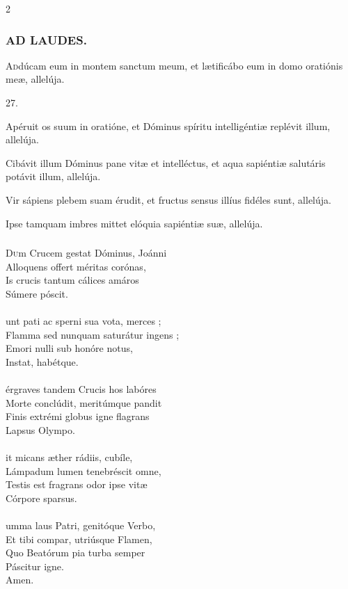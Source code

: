 \documentclass[9pt,twoside]{extarticle}
\begin{document}
\begin{multicols}{2}
{\subsubsection*{\center \textsc{AD LAUDES.}}
\begin{center}\end{center}
\lettrine{A}ddúcam eum in montem sanctum meum, et lætificábo eum in domo oratiónis meæ, allelúja.

\begin{tightlist}{}
\item {} 27.
\item {} Apéruit os suum in oratióne, et Dóminus spíritu intelligéntiæ replévit illum, allelúja.
\item {} Cibávit illum Dóminus pane vitæ et intelléctus, et aqua sapiéntiæ salutáris potávit illum, allelúja.
\item {} Vir sápiens plebem suam érudit, et fructus sensus illíus fidéles sunt, allelúja.
\item {} Ipse tamquam imbres mittet elóquia sapiéntiæ suæ, allelúja.
\end{tightlist}

\subsubsection*{\center {}}
\lettrine{D}um Crucem gestat Dóminus, Joánni\\
Alloquens offert méritas corónas,\\
Is crucis tantum cálices amáros\\
Súmere póscit.\\
\\
unt pati ac sperni sua vota, merces ;\\
Flamma sed nunquam saturátur ingens ;\\
Emori nulli sub honóre notus,\\
Instat, habétque.\\
\\
érgraves tandem Crucis hos labóres\\
Morte conclúdit, meritúmque pandit\\
Finis extrémi globus igne flagrans\\
Lapsus Olympo.\\
\\
it micans æther rádiis, cubíle,\\
Lámpadum lumen tenebréscit omne,\\
Testis est fragrans odor ipse vitæ\\
Córpore sparsus.\\
\\
umma laus Patri, genitóque Verbo,\\
Et tibi compar, utriúsque Flamen,\\
Quo Beatórum pia turba semper\\
Páscitur igne.\\
Amen.

}
\end{multicols}
\end{document}
